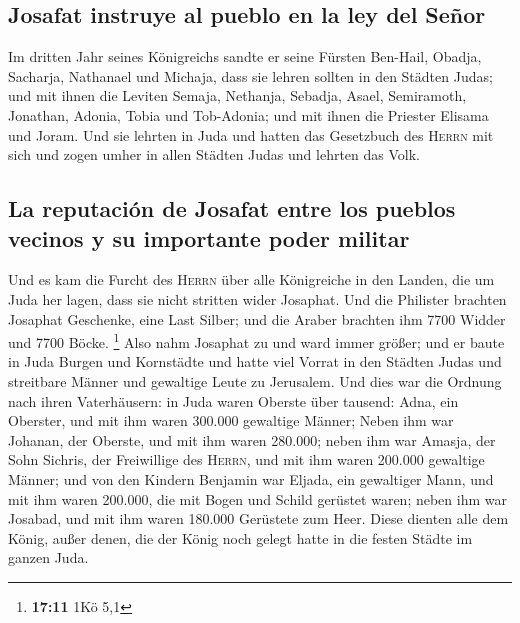 \hypertarget{josafat-instruye-al-pueblo-en-la-ley-del-seuxf1or}{%
\subsection{Josafat instruye al pueblo en la ley del
Señor}\label{josafat-instruye-al-pueblo-en-la-ley-del-seuxf1or}}

 Im dritten Jahr seines Königreichs sandte er seine
Fürsten Ben-Hail, Obadja, Sacharja, Nathanael und Michaja, dass sie
lehren sollten in den Städten Judas;  und mit ihnen die
Leviten Semaja, Nethanja, Sebadja, Asael, Semiramoth, Jonathan, Adonia,
Tobia und Tob-Adonia; und mit ihnen die Priester Elisama und Joram.
 Und sie lehrten in Juda und hatten das Gesetzbuch des
\textsc{Herrn} mit sich und zogen umher in allen Städten Judas und
lehrten das Volk.

\hypertarget{la-reputaciuxf3n-de-josafat-entre-los-pueblos-vecinos-y-su-importante-poder-militar}{%
\subsection{La reputación de Josafat entre los pueblos vecinos y su
importante poder
militar}\label{la-reputaciuxf3n-de-josafat-entre-los-pueblos-vecinos-y-su-importante-poder-militar}}

 Und es kam die Furcht des \textsc{Herrn} über alle
Königreiche in den Landen, die um Juda her lagen, dass sie nicht
stritten wider Josaphat.  Und die Philister brachten
Josaphat Geschenke, eine Last Silber; und die Araber brachten ihm 7700
Widder und 7700 Böcke. \footnote{\textbf{17:11} 1Kö 5,1} 
Also nahm Josaphat zu und ward immer größer; und er baute in Juda Burgen
und Kornstädte  und hatte viel Vorrat in den Städten
Judas und streitbare Männer und gewaltige Leute zu Jerusalem.
 Und dies war die Ordnung nach ihren Vaterhäusern: in
Juda waren Oberste über tausend: Adna, ein Oberster, und mit ihm waren
300.000 gewaltige Männer;  Neben ihm war Johanan, der
Oberste, und mit ihm waren 280.000;  neben ihm war
Amasja, der Sohn Sichris, der Freiwillige des \textsc{Herrn}, und mit
ihm waren 200.000 gewaltige Männer;  und von den Kindern
Benjamin war Eljada, ein gewaltiger Mann, und mit ihm waren 200.000, die
mit Bogen und Schild gerüstet waren;  neben ihm war
Josabad, und mit ihm waren 180.000 Gerüstete zum Heer. 
Diese dienten alle dem König, außer denen, die der König noch gelegt
hatte in die festen Städte im ganzen Juda.

